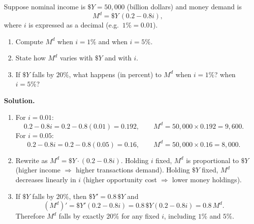 \begin{examplebox}[title={Worked Example (Tutorial 2, Question 2): Money demand levels and proportional shifts}]
Suppose nominal income is $\$Y=50{,}000$ (billion dollars) and money demand is
\[
M^d = \$Y\,(0.2-0.8i),
\]
where $i$ is expressed as a decimal (e.g.\ $1\%=0.01$).
\begin{enumerate}[label=(\alph*)]
  \item Compute $M^d$ when $i=1\%$ and when $i=5\%$.
  \item State how $M^d$ varies with $\$Y$ and with $i$.
  \item If $\$Y$ falls by $20\%$, what happens (in percent) to $M^d$ when $i=1\%$? when $i=5\%$?
\end{enumerate}

\textbf{Solution.}
\begin{enumerate}[label=(\alph*)]
  \item For $i=0.01$:
  \[
  0.2-0.8i=0.2-0.8(0.01)=0.192,
  \qquad
  M^d=50{,}000\times 0.192=9{,}600.
  \]
  For $i=0.05$:
  \[
  0.2-0.8i=0.2-0.8(0.05)=0.16,
  \qquad
  M^d=50{,}000\times 0.16=8{,}000.
  \]

  \item Rewrite as $M^d=\$Y\cdot(0.2-0.8i)$.
  Holding $i$ fixed, $M^d$ is proportional to $\$Y$ (higher income $\Rightarrow$ higher transactions demand).
  Holding $\$Y$ fixed, $M^d$ decreases linearly in $i$ (higher opportunity cost $\Rightarrow$ lower money holdings).

  \item If $\$Y$ falls by $20\%$, then $\$Y' = 0.8\,\$Y$ and
  \[
  (M^d)'=\$Y'(0.2-0.8i)=0.8\,\$Y(0.2-0.8i)=0.8\,M^d.
  \]
  Therefore $M^d$ falls by exactly $20\%$ for any fixed $i$, including $1\%$ and $5\%$.
\end{enumerate}
\end{examplebox}

